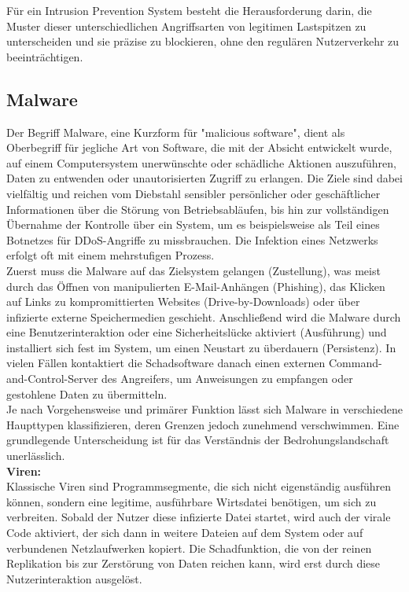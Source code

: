 Für ein Intrusion Prevention System besteht die Herausforderung darin, die Muster dieser unterschiedlichen Angriffsarten von legitimen Lastspitzen zu unterscheiden und sie präzise zu blockieren, ohne den regulären Nutzerverkehr zu beeinträchtigen.

\subsection{Malware}

Der Begriff Malware, eine Kurzform für "malicious software", dient als Oberbegriff für jegliche Art von Software, die mit der Absicht entwickelt wurde, auf einem Computersystem unerwünschte oder schädliche Aktionen auszuführen, Daten zu entwenden oder unautorisierten Zugriff zu erlangen. Die Ziele sind dabei vielfältig und reichen vom Diebstahl sensibler persönlicher oder geschäftlicher Informationen über die Störung von Betriebsabläufen, bis hin zur vollständigen Übernahme der Kontrolle über ein System, um es beispielsweise als Teil eines Botnetzes für DDoS-Angriffe zu missbrauchen. Die Infektion eines Netzwerks erfolgt oft mit einem mehrstufigen Prozess.\\

 Zuerst muss die Malware auf das Zielsystem gelangen (Zustellung), was meist durch das Öffnen von manipulierten E-Mail-Anhängen (Phishing), das Klicken auf Links zu kompromittierten Websites (Drive-by-Downloads) oder über infizierte externe Speichermedien geschieht. Anschließend wird die Malware durch eine Benutzerinteraktion oder eine Sicherheitslücke aktiviert (Ausführung) und installiert sich fest im System, um einen Neustart zu überdauern (Persistenz). In vielen Fällen kontaktiert die Schadsoftware danach einen externen Command-and-Control-Server des Angreifers, um Anweisungen zu empfangen oder gestohlene Daten zu übermitteln.\\

Je nach Vorgehensweise und primärer Funktion lässt sich Malware in verschiedene Haupttypen klassifizieren, deren Grenzen jedoch zunehmend verschwimmen. Eine grundlegende Unterscheidung ist für das Verständnis der Bedrohungslandschaft unerlässlich.\\

\textbf{Viren:}\\
Klassische Viren sind Programmsegmente, die sich nicht eigenständig ausführen können, sondern eine legitime, ausführbare Wirtsdatei benötigen, um sich zu verbreiten. Sobald der Nutzer diese infizierte Datei startet, wird auch der virale Code aktiviert, der sich dann in weitere Dateien auf dem System oder auf verbundenen Netzlaufwerken kopiert. Die Schadfunktion, die von der reinen Replikation bis zur Zerstörung von Daten reichen kann, wird erst durch diese Nutzerinteraktion ausgelöst.\cite{BSI1} \\

